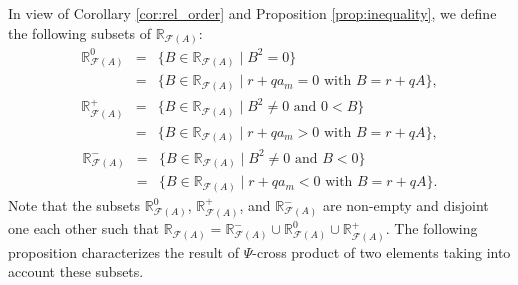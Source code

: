 \documentclass[12pt,a4paper]{article}
\newcommand{\RFA}{\mathbb{R}_{\mathcal{F}(A)}}
\begin{document}
In view of Corollary \ref{cor:rel_order} and Proposition \ref{prop:inequality}, we define the following subsets of $\RFA$:
\begin{eqnarray}
\RFA^0 & = & \{B \in \RFA \mid B^2 = 0\} \\     
 & = & \{B \in \RFA \mid r + qa_m = 0  \mbox{  with  }  B = r+qA  \}, \nonumber
\end{eqnarray}
\begin{eqnarray}
\RFA^+ & = & \{B \in \RFA \mid B^2 \neq 0 \mbox{  and  } 0 < B\} \\     
 & = & \{B \in \RFA \mid r + qa_m > 0  \mbox{  with  }  B = r+qA  \}, \nonumber
\end{eqnarray}
\begin{eqnarray}
\RFA^- & = & \{B \in \RFA \mid B^2 \neq 0 \mbox{  and  } B < 0\} \\     
 & = & \{B \in \RFA \mid r + qa_m < 0  \mbox{  with  }  B = r+qA  \}. \nonumber
\end{eqnarray}
Note that the subsets $\RFA^0$, $\RFA^+$, and $\RFA^-$ are non-empty and disjoint one each other such that $\RFA = \RFA^- \cup \RFA^0 \cup \RFA^+$. The following proposition characterizes the result of  $\Psi$-cross product of two elements taking into account these subsets. 
\end{document}
